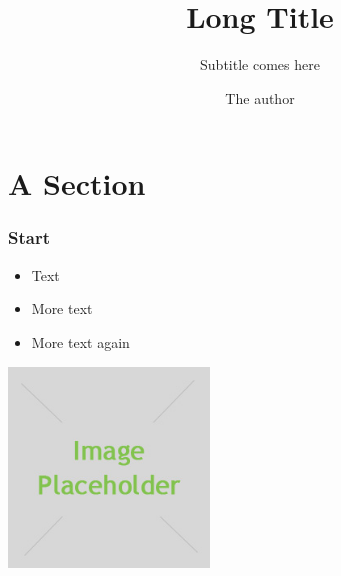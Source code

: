 \title[Short Title]{Long Title}
\subtitle{Subtitle comes here}
\author{The author}
\date{}



\maketitle




\section{A Section}

\begin{frame} 
\frametitle{Start}
\begin{itemize}[<+->]
 \item Text
 \item More text
 \item More text again
\end{itemize}
\begin{center}
  \includegraphics[width=0.4\textwidth]{./placeholder.jpg}
\end{center}
\end{frame}

